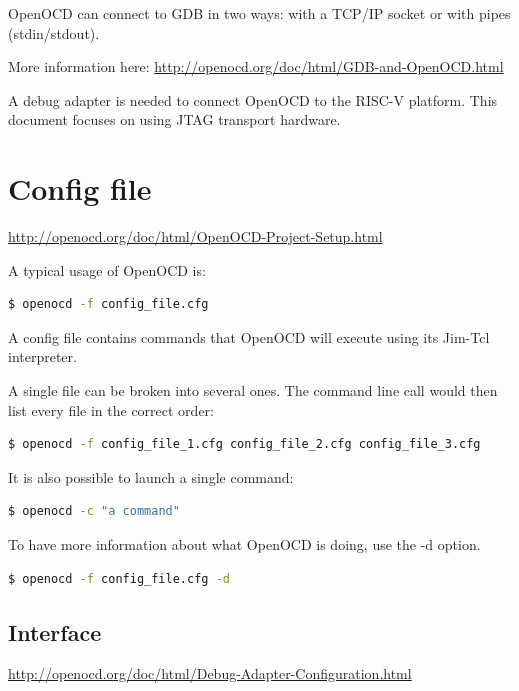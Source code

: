 \documentclass{article}
\begin{document}
	OpenOCD can connect to GDB in two ways: with a TCP/IP socket or with pipes (stdin/stdout). 
	
	More information here: \url{http://openocd.org/doc/html/GDB-and-OpenOCD.html}
	
	A debug adapter is needed to connect OpenOCD to the RISC-V platform. This document focuses on using JTAG transport hardware.
	
	\newpage
	\section{Config file}
	
	\url{http://openocd.org/doc/html/OpenOCD-Project-Setup.html}
	
	A typical usage of OpenOCD is:
	
	\begin{lstlisting}[language=bash]
    $ openocd -f config_file.cfg
    \end{lstlisting}
    
    A config file contains commands that OpenOCD will execute using its Jim-Tcl interpreter.
    
    A single file can be broken into several ones. The command line call would then list every file in the correct order:
    
    \begin{lstlisting}[language=bash]
    $ openocd -f config_file_1.cfg config_file_2.cfg config_file_3.cfg
    \end{lstlisting}
    
    It is also possible to launch a single command:
    
    \begin{lstlisting}[language=bash]
    $ openocd -c "a command"
    \end{lstlisting}
    
    To have more information about what OpenOCD is doing, use the -d option.
    
    \begin{lstlisting}[language=bash]
    $ openocd -f config_file.cfg -d
    \end{lstlisting}
    
    \subsection{Interface}
    
    \url{http://openocd.org/doc/html/Debug-Adapter-Configuration.html}
    
\end{document}
